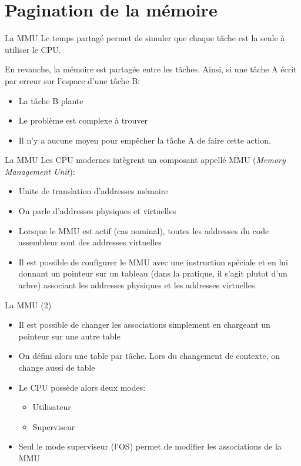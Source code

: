 \section{Pagination de la mémoire}

\begin{frame}{La MMU}
  Le temps partagé  permet de simuler que chaque tâche  est la seule à
  utiliser le CPU.

  En revanche, la mémoire est partagée entre les tâches. Ainsi, si une
  tâche A écrit par erreur sur l'espace d'une tâche B:
  \begin{itemize} 
  \item  La tâche B plante
  \item  Le problème est complexe à trouver
  \item Il  n'y a  aucune moyen  pour empêcher la  tâche A  de faire
    cette action.
  \end{itemize} 
\end{frame}

\begin{frame}{La MMU}  
  Les  CPU  modernes  intègrent   un  composant  appellé  MMU  (\emph{Memory
  Management Unit}):
  \begin{itemize}
  \item  Unite de translation d'addresses mémoire
  \item  On parle d'addresses physiques et virtuelles
  \item Lorsque le  MMU est actif (cas nominal),  toutes les addresses
    du code assembleur sont des addresses virtuelles
  \item  Il est  possible de  configurer le  MMU avec  une instruction
    spéciale et  en lui  donnant un pointeur  sur un tableau  (dans la
    pratique,  il s'agit  plutot d'un  arbre) associant  les addresses
    physiques et les addresses virtuelles
  \end{itemize}
\end{frame}

\begin{frame}{La MMU (2)}  
  \begin{itemize} 
  \item  Il est  possible  de changer  les  associations simplement  en
    chargeant un pointeur sur une autre table
  \item On  défini alors une table  par tâche.  Lors  du changement de
    contexte, on change aussi de table
  \item Le CPU possède alors deux modes:
    \begin{itemize}
    \item  Utilisateur
    \item  Superviseur
    \end{itemize} 
  \item  Seul  le  mode  superviseur  (l'OS) permet  de  modifier  les
    associations de la MMU
  \end{itemize}
\end{frame} 

